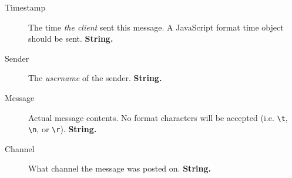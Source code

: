 \documentclass[12pt]{scrartcl}
\begin{document}
\begin{description}
    \item[Timestamp] The time \textit{the client} sent this message. A JavaScript format time object should be sent. \textbf{String.}
    \item[Sender] The \textit{username} of the sender. \textbf{String.}
    \item[Message] Actual message contents. No format characters will be accepted (i.e. \texttt{\textbackslash t}, \texttt{\textbackslash n}, or \texttt{\textbackslash r}). \textbf{String.}
    \item[Channel] What channel the message was posted on. \textbf{String.}
\end{description}
\end{document}

